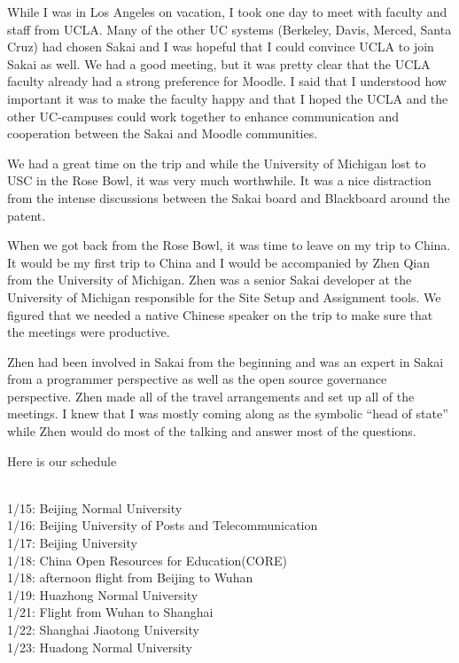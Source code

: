 \documentclass[12pt]{book}
\begin{document}
While I was in Los Angeles on vacation, I took one day to meet with faculty and
staff from UCLA.  Many of the other UC systems (Berkeley, Davis, Merced, Santa Cruz)
had chosen Sakai and I was hopeful that I could convince UCLA to join Sakai as well.
We had a good meeting, but it was pretty clear that the UCLA faculty already had
a strong preference for Moodle.  I said that I understood how important
it was to make the faculty happy and that I
hoped the UCLA and the other UC-campuses could work together to enhance
communication and cooperation
between the Sakai and Moodle communities.

We had a great time on the trip and while the University of Michigan lost to
USC in the Rose Bowl, it was very much worthwhile.  It was a nice
distraction from the intense discussions between the Sakai board
and Blackboard around the patent.

When we got back from the Rose Bowl, it was time to leave on my
trip to China.
It would be my first trip to China and I would be accompanied by
Zhen Qian from the University of Michigan.  Zhen was a senior Sakai
developer at the University of Michigan responsible for the Site Setup
and Assignment tools.  We figured that we needed a native Chinese speaker
on the trip to make sure that the meetings were productive.

Zhen had been involved in Sakai from the beginning and was an expert
in Sakai from a programmer perspective as well as the open source
governance perspective.   Zhen made all of the travel arrangements
and set up all of the meetings.  I knew that I was mostly coming along
as the symbolic ``head of state'' while Zhen would do most of the talking and
answer most of the questions.

Here is our schedule\\
\\
\begin{sf}
1/15: Beijing Normal University\\
1/16: Beijing University of Posts and Telecommunication\\
1/17: Beijing University\\
1/18: China Open Resources for Education(CORE)\\
1/18: afternoon flight from Beijing to Wuhan\\
1/19: Huazhong Normal University\\
1/21: Flight from Wuhan to Shanghai\\
1/22: Shanghai Jiaotong University \\
1/23: Huadong Normal University\\
\end{sf}
\end{document}
